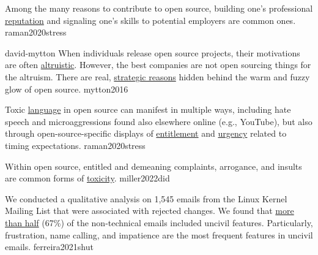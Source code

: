 \documentclass{article}
\begin{document}


  {Among the many reasons to contribute to open source, building one's professional \ul{reputation} and signaling one's skills to potential employers are common ones.}
  {raman2020stress}

\lnQuote
  {david-mytton}
  {When individuals release open source projects, their motivations are often \ul{altruistic}. However, the best companies are not open sourcing things for the altruism. There are real, \ul{strategic reasons} hidden behind the warm and fuzzy glow of open source.}
  {mytton2016}


  {Toxic \ul{language} in open source can manifest in multiple ways, including hate speech and microaggressions found also elsewhere online (e.g., YouTube), but also through open-source-specific displays of \ul{entitlement} and \ul{urgency} related to timing expectations.}
  {raman2020stress}

  {Within open source, entitled and demeaning complaints, arrogance, and insults are common forms of \ul{toxicity}.}
  {miller2022did}

  {We conducted a qualitative analysis on 1,545 emails from the Linux Kernel Mailing List that were associated with rejected changes. We found that \ul{more than half} (67\%) of the non-technical emails included uncivil features. Particularly, frustration, name calling, and impatience are the most frequent features in uncivil emails.}
  {ferreira2021shut}

\end{document}
